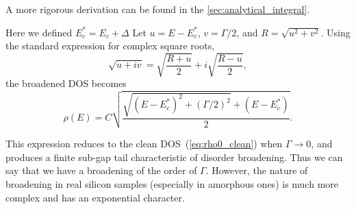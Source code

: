 A more rigorous derivation can be found in the \ref{sec:analytical_integral}.

Here we defined $E_c^* = E_c + \Delta$ Let $u = E - E_c^*$, $v = \Gamma/2$, and 
$R=\sqrt{u^2+v^2}$.  
Using the standard expression for complex square roots,
\[
\sqrt{u + iv}
=
\sqrt{\frac{R + u}{2}}
+ i \sqrt{\frac{R - u}{2}},
\]
the broadened DOS becomes
\begin{equation}
\label{eq:rho_final}
\rho(E) =
C \sqrt{
\frac{
\sqrt{(E - E_c^*)^2 + (\Gamma/2)^2}
+ (E - E_c^*)
}{2}
}.
\end{equation}

This expression reduces to the clean DOS~(\ref{eq:rho0_clean}) when $\Gamma\rightarrow 0$, and produces a finite sub-gap tail characteristic of disorder broadening. Thus we can say that we have a broadening of the order of $\Gamma$. However, the nature of broadening in real silicon samples (especially in amorphous ones) is much more complex and has an exponential character.












